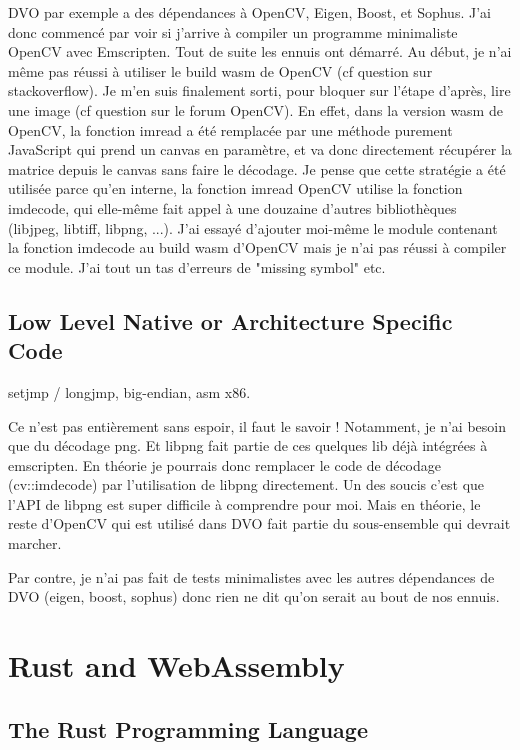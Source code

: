DVO par exemple a des dépendances à OpenCV, Eigen, Boost, et Sophus. J’ai donc commencé par voir si j’arrive à compiler un programme minimaliste OpenCV avec Emscripten. Tout de suite les ennuis ont démarré. Au début, je n’ai même pas réussi à utiliser le build wasm de OpenCV (cf question sur stackoverflow). Je m’en suis finalement sorti, pour bloquer sur l’étape d’après, lire une image (cf question sur le forum OpenCV). En effet, dans la version wasm de OpenCV, la fonction imread a été remplacée par une méthode purement JavaScript qui prend un canvas en paramètre, et va donc directement récupérer la matrice depuis le canvas sans faire le décodage. Je pense que cette stratégie a été utilisée parce qu’en interne, la fonction imread OpenCV utilise la fonction imdecode, qui elle-même fait appel à une douzaine d’autres bibliothèques (libjpeg, libtiff, libpng, ...). J’ai essayé d’ajouter moi-même le module contenant la fonction imdecode au build wasm d’OpenCV mais je n’ai pas réussi à compiler ce module. J’ai tout un tas d’erreurs de "missing symbol" etc.

\subsection{Low Level Native or Architecture Specific Code}%
\label{sub:low_level_code}

setjmp / longjmp, big-endian, asm x86.

Ce n’est pas entièrement sans espoir, il faut le savoir ! Notamment, je n’ai besoin que du décodage png. Et libpng fait partie de ces quelques lib déjà intégrées à emscripten. En théorie je pourrais donc remplacer le code de décodage (cv::imdecode) par l’utilisation de libpng directement. Un des soucis c’est que l’API de libpng est super difficile à comprendre pour moi. Mais en théorie, le reste d’OpenCV qui est utilisé dans DVO fait partie du sous-ensemble qui devrait marcher.

Par contre, je n’ai pas fait de tests minimalistes avec les autres dépendances de DVO (eigen, boost, sophus) donc rien ne dit qu’on serait au bout de nos ennuis.

\section{Rust and WebAssembly}%
\label{sec:rust_wasm}

\subsection{The Rust Programming Language}%
\label{sub:rust_language}

